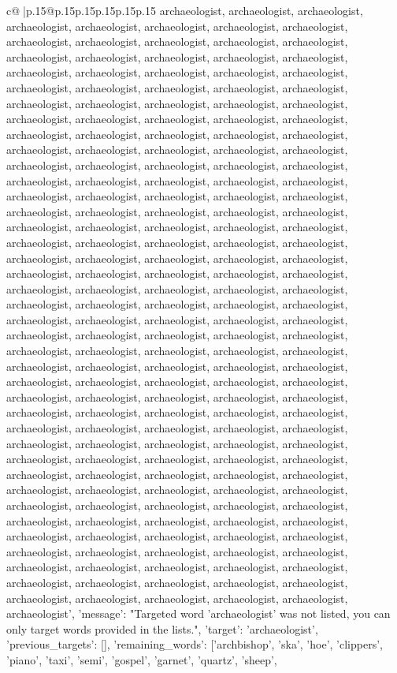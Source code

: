 \documentclass{article}
\begin{document}
{\begin{supertabular}{c@{$\;$}|p{.15\linewidth}@{}p{.15\linewidth}p{.15\linewidth}p{.15\linewidth}p{.15\linewidth}p{.15\linewidth}}
{{{archaeologist, archaeologist, archaeologist, archaeologist, archaeologist, archaeologist, archaeologist, archaeologist, archaeologist, archaeologist, archaeologist, archaeologist, archaeologist, archaeologist, archaeologist, archaeologist, archaeologist, archaeologist, archaeologist, archaeologist, archaeologist, archaeologist, archaeologist, archaeologist, archaeologist, archaeologist, archaeologist, archaeologist, archaeologist, archaeologist, archaeologist, archaeologist, archaeologist, archaeologist, archaeologist, archaeologist, archaeologist, archaeologist, archaeologist, archaeologist, archaeologist, archaeologist, archaeologist, archaeologist, archaeologist, archaeologist, archaeologist, archaeologist, archaeologist, archaeologist, archaeologist, archaeologist, archaeologist, archaeologist, archaeologist, archaeologist, archaeologist, archaeologist, archaeologist, archaeologist, archaeologist, archaeologist, archaeologist, archaeologist, archaeologist, archaeologist, archaeologist, archaeologist, archaeologist, archaeologist, archaeologist, archaeologist, archaeologist, archaeologist, archaeologist, archaeologist, archaeologist, archaeologist, archaeologist, archaeologist, archaeologist, archaeologist, archaeologist, archaeologist, archaeologist, archaeologist, archaeologist, archaeologist, archaeologist, archaeologist, archaeologist, archaeologist, archaeologist, archaeologist, archaeologist, archaeologist, archaeologist, archaeologist, archaeologist, archaeologist, archaeologist, archaeologist, archaeologist, archaeologist, archaeologist, archaeologist, archaeologist, archaeologist, archaeologist, archaeologist, archaeologist, archaeologist, archaeologist, archaeologist, archaeologist, archaeologist, archaeologist, archaeologist, archaeologist, archaeologist, archaeologist, archaeologist, archaeologist, archaeologist, archaeologist, archaeologist, archaeologist, archaeologist, archaeologist, archaeologist, archaeologist, archaeologist, archaeologist, archaeologist, archaeologist, archaeologist, archaeologist, archaeologist, archaeologist, archaeologist, archaeologist, archaeologist, archaeologist, archaeologist, archaeologist, archaeologist, archaeologist, archaeologist, archaeologist, archaeologist, archaeologist, archaeologist, archaeologist, archaeologist, archaeologist, archaeologist, archaeologist, archaeologist, archaeologist, archaeologist, archaeologist, archaeologist, archaeologist, archaeologist, archaeologist, archaeologist, archaeologist, archaeologist, archaeologist, archaeologist, archaeologist, archaeologist, archaeologist, archaeologist, archaeologist, archaeologist, archaeologist, archaeologist, archaeologist, archaeologist, archaeologist, archaeologist, archaeologist, archaeologist, archaeologist, archaeologist, archaeologist, archaeologist, archaeologist, archaeologist, archaeologist, archaeologist, archaeologist, archaeologist', 'message': "Targeted word 'archaeologist' was not listed, you can only target words provided in the lists.", 'target': 'archaeologist', 'previous_targets': [], 'remaining_words': ['archbishop', 'ska', 'hoe', 'clippers', 'piano', 'taxi', 'semi', 'gospel', 'garnet', 'quartz', 'sheep', }}}
\end{supertabular}}
\end{document}
